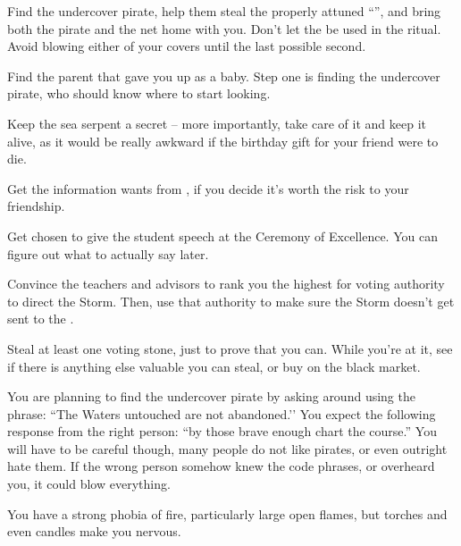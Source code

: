 \documentclass[char]{GL2020}
\begin{document}
\begin{itemz}
	\item Find the undercover pirate, help them steal the properly attuned ``\iNet{}'', and bring both the pirate and the net home with you. Don't let the \iNet{} be used in the ritual. Avoid blowing either of your covers until the last possible second.
	\item Find the parent that gave you up as a baby. Step one is finding the undercover pirate, who should know where to start looking.
	\item Keep the sea serpent a secret – more importantly, take care of it and keep it alive, as it would be really awkward if the birthday gift for your friend were to die.
	\item Get the information \cWildCard{} wants from \cDisney{}, if you decide it's worth the risk to your friendship.
	\item Get chosen to give the student speech at the Ceremony of Excellence. You can figure out what to actually say later.
	\item Convince the \pFarm{} teachers and \pShip{} advisors to rank you the highest for voting authority to direct the Storm. Then, use that authority to make sure the Storm doesn't get sent to the \pShip{}.
	\item Steal at least one voting stone, just to prove that you can. While you're at it, see if there is anything else valuable you can steal, or buy on the black market. 
\end{itemz}

\begin{itemz}[Notes]
	\item You are planning to find the undercover pirate by asking around using the phrase: ``The Waters untouched are not abandoned.'’ You expect the following response from the right person: ``by those brave enough chart the course.'' You will have to be careful though, many people do not like pirates, or even outright hate them. If the wrong person somehow knew the code phrases, or overheard you, it could blow everything.
	\item You have a strong phobia of fire, particularly large open flames, but torches and even candles make you nervous.
\end{itemz}
\end{document}
